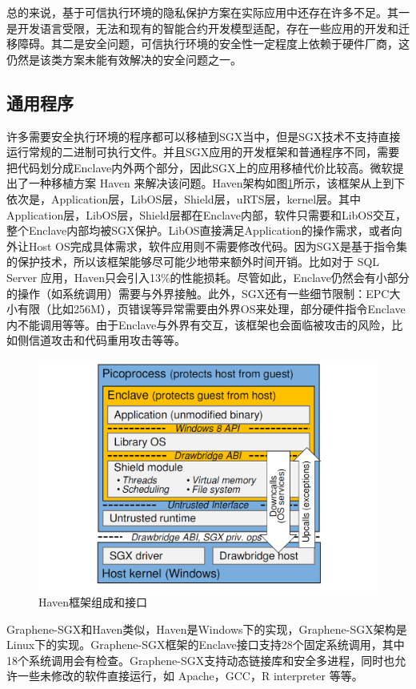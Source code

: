\documentclass{source/Paper}
\begin{document}
        总的来说，基于可信执行环境的隐私保护方案在实际应用中还存在许多不足。其一是开发语言受限，无法和现有的智能合约开发模型适配，存在一些应用的开发和迁移障碍。其二是安全问题，可信执行环境的安全性一定程度上依赖于硬件厂商，这仍然是该类方案未能有效解决的安全问题之一。

        \subsection{通用程序}

        许多需要安全执行环境的程序都可以移植到SGX当中，但是SGX技术不支持直接运行常规的二进制可执行文件。并且SGX应用的开发框架和普通程序不同，需要把代码划分成Enclave内外两个部分，因此SGX上的应用移植代价比较高。微软提出了一种移植方案 Haven\cite{baumann2015shielding} 来解决该问题。Haven架构如图\ref{haven}所示，该框架从上到下依次是，Application层，LibOS层，Shield层，uRTS层，kernel层。其中Application层，LibOS层，Shield层都在Enclave内部，软件只需要和LibOS交互，整个Enclave内部均被SGX保护。LibOS直接满足Application的操作需求，或者向外让Host OS完成具体需求，软件应用则不需要修改代码。因为SGX是基于指令集的保护技术，所以该框架能够尽可能少地带来额外时间开销。比如对于 SQL Server 应用，Haven只会引入13\%的性能损耗。尽管如此，Enclave仍然会有小部分的操作（如系统调用）需要与外界接触。此外，SGX还有一些细节限制：EPC大小有限（比如256M），页错误等异常需要由外界OS来处理，部分硬件指令Enclave内不能调用等等。由于Enclave与外界有交互，该框架也会面临被攻击的风险，比如侧信道攻击和代码重用攻击\cite{biondo2018guard}等等。

        \begin{figure}[H]
            \centering
            \includegraphics[width=0.7\linewidth]{pic/haven.png}
            \caption{Haven框架组成和接口}
            \label{haven}
        \end{figure}

        Graphene-SGX\cite{tsai2017graphene}和Haven类似，Haven是Windows下的实现，Graphene-SGX架构是Linux下的实现。Graphene-SGX框架的Enclave接口支持28个固定系统调用，其中18个系统调用会有检查。Graphene-SGX支持动态链接库和安全多进程，同时也允许一些未修改的软件直接运行，如 Apache，GCC，R interpreter 等等。
\end{document}
